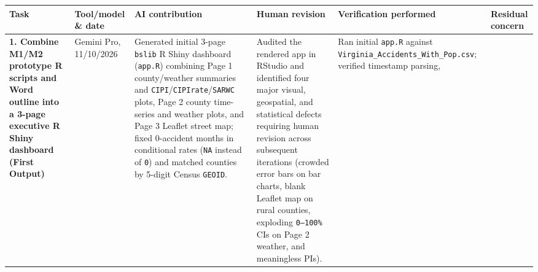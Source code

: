 \documentclass[
  letterpaper,
  DIV=11,
  numbers=noendperiod]{scrartcl}
\newcounter{none} %
\begin{document}
{\def\LTcaptype{none} %
\begin{longtable}[]{@{}
  >{\raggedright\arraybackslash}p{}
  >{\raggedright\arraybackslash}p{}
  >{\raggedright\arraybackslash}p{}
  >{\raggedright\arraybackslash}p{}
  >{\raggedright\arraybackslash}p{}
  >{\raggedright\arraybackslash}p{}@{}}
\toprule\noalign{}
\begin{minipage}[b]{\linewidth}\raggedright
Task
\end{minipage} & \begin{minipage}[b]{\linewidth}\raggedright
Tool/model \& date
\end{minipage} & \begin{minipage}[b]{\linewidth}\raggedright
AI contribution
\end{minipage} & \begin{minipage}[b]{\linewidth}\raggedright
Human revision
\end{minipage} & \begin{minipage}[b]{\linewidth}\raggedright
Verification performed
\end{minipage} & \begin{minipage}[b]{\linewidth}\raggedright
Residual concern
\end{minipage} \\
\midrule\noalign{}
\endhead
\bottomrule\noalign{}
\endlastfoot
\textbf{1. Combine M1/M2 prototype R scripts and Word outline into a
3-page executive R Shiny dashboard (First Output)} & Gemini Pro,
11/10/2026 & Generated initial 3-page \texttt{bslib} R Shiny dashboard
(\texttt{app.R}) combining Page 1 county/weather summaries and
\texttt{CIPI}/\texttt{CIPIrate}/\texttt{SARWC} plots, Page 2 county
time-series and weather plots, and Page 3 Leaflet street map; fixed
0-accident months in conditional rates (\texttt{NA} instead of
\texttt{0}) and matched counties by 5-digit Census \texttt{GEOID}. &
Audited the rendered app in RStudio and identified four major visual,
geospatial, and statistical defects requiring human revision across
subsequent iterations (crowded error bars on bar charts, blank Leaflet
map on rural counties, exploding \texttt{0–100\%} CIs on Page 2 weather,
and meaningless PIs). & Ran initial \texttt{app.R} against
\texttt{Virginia\_Accidents\_With\_Pop.csv}; verified timestamp parsing,

\end{longtable}}
\end{document}
